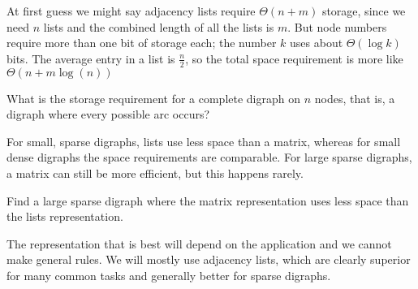 At first guess we might say adjacency lists require $\Theta(n + m)$ storage, 
since we need $n$ lists and the combined length of all the lists is $m$.
But node numbers require more than one bit of storage each; the number $k$ uses about $\Theta(\log k)$ bits.
The average entry in a list is $\frac n 2$, so the total space requirement is more like $\Theta(n + m \log(n))$ 

\begin{Boxample}[5]
What is the storage requirement for a complete digraph on $n$ nodes, that is, a digraph where every possible arc
occurs?
\end{Boxample}

For small, sparse digraphs, lists use less space than a matrix, whereas for small
dense digraphs the space requirements are comparable. For large sparse
digraphs, a matrix can still be more efficient, but this happens rarely.

\begin{Boxample}[5]
Find a large sparse digraph where the matrix representation uses less space than the lists representation.
\end{Boxample}

The representation that is best will depend on the application and we cannot make general rules.  
We will mostly use adjacency lists, which are
clearly superior for many common tasks and generally better for sparse digraphs.

